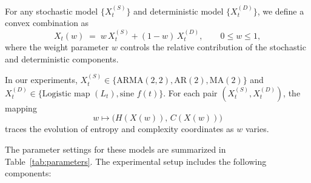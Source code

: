 \documentclass[12pt,a4paper]{article}
\begin{document}
\noindent
For any stochastic model $\{X_t^{(S)}\}$ and deterministic model $\{X_t^{(D)}\}$, 
we define a convex combination as
\[
X_t(w) \;=\; w\,X_t^{(S)} + (1-w)\,X_t^{(D)}, 
\qquad 0 \le w \le 1,
\]
where the weight parameter $w$ controls the relative contribution of the stochastic and deterministic components.

\noindent
In our experiments, $X_t^{(S)} \in \{\mathrm{ARMA}(2,2), \mathrm{AR}(2), \mathrm{MA}(2)\}$ 
and $X_t^{(D)} \in \{\text{Logistic map } (L_t), \text{sine } f(t)\}$.
For each pair $(X_t^{(S)}, X_t^{(D)})$, the mapping
\[
w \longmapsto \bigl(H(X(w)),\, C(X(w))\bigr)
\]
traces the evolution of entropy and complexity coordinates as $w$ varies.

\noindent
The parameter settings for these models are summarized in Table~\ref{tab:parameters}. 
The experimental setup includes the following components:
\end{document}
